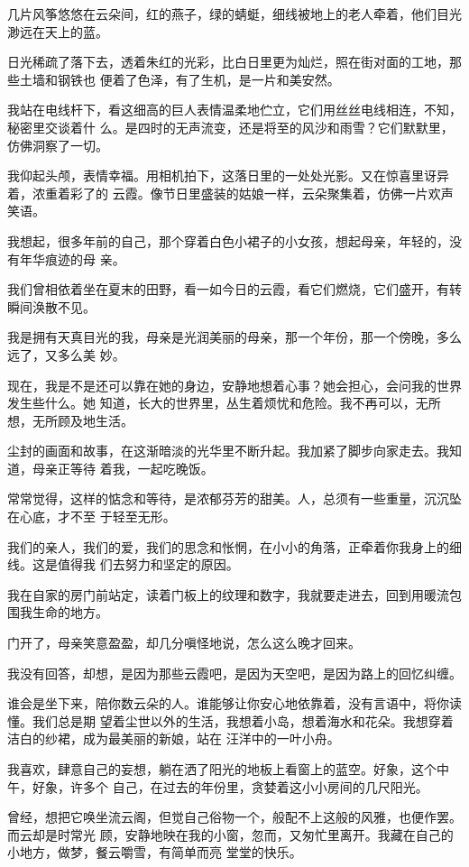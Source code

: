 		几片风筝悠悠在云朵间，红的燕子，绿的蜻蜓，细线被地上的老人牵着，他们目光渺远在天上的蓝。

		日光稀疏了落下去，透着朱红的光彩，比白日里更为灿烂，照在街对面的工地，那些土墙和钢铁也
	便着了色泽，有了生机，是一片和美安然。

		我站在电线杆下，看这细高的巨人表情温柔地伫立，它们用丝丝电线相连，不知，秘密里交谈着什
	么。是四时的无声流变，还是将至的风沙和雨雪？它们默默里，仿佛洞察了一切。


		我仰起头颅，表情幸福。用相机拍下，这落日里的一处处光影。又在惊喜里讶异着，浓重着彩了的
	云霞。像节日里盛装的姑娘一样，云朵聚集着，仿佛一片欢声笑语。

		我想起，很多年前的自己，那个穿着白色小裙子的小女孩，想起母亲，年轻的，没有年华痕迹的母
	亲。

		我们曾相依着坐在夏末的田野，看一如今日的云霞，看它们燃烧，它们盛开，有转瞬间涣散不见。

		我是拥有天真目光的我，母亲是光润美丽的母亲，那一个年份，那一个傍晚，多么远了，又多么美
	妙。

		现在，我是不是还可以靠在她的身边，安静地想着心事？她会担心，会问我的世界发生些什么。她
	知道，长大的世界里，丛生着烦忧和危险。我不再可以，无所想，无所顾及地生活。


		尘封的画面和故事，在这渐暗淡的光华里不断升起。我加紧了脚步向家走去。我知道，母亲正等待
	着我，一起吃晚饭。

		常常觉得，这样的惦念和等待，是浓郁芬芳的甜美。人，总须有一些重量，沉沉坠在心底，才不至
	于轻至无形。

		我们的亲人，我们的爱，我们的思念和怅惘，在小小的角落，正牵着你我身上的细线。这是值得我
	们去努力和坚定的原因。

		我在自家的房门前站定，读着门板上的纹理和数字，我就要走进去，回到用暖流包围我生命的地方。

		门开了，母亲笑意盈盈，却几分嗔怪地说，怎么这么晚才回来。

		我没有回答，却想，是因为那些云霞吧，是因为天空吧，是因为路上的回忆纠缠。


		谁会是坐下来，陪你数云朵的人。谁能够让你安心地依靠着，没有言语中，将你读懂。我们总是期
	望着尘世以外的生活，我想着小岛，想着海水和花朵。我想穿着洁白的纱裙，成为最美丽的新娘，站在
	汪洋中的一叶小舟。


		我喜欢，肆意自己的妄想，躺在洒了阳光的地板上看窗上的蓝空。好象，这个中午，好象，许多个
	自己，在过去的年份里，贪婪着这小小房间的几尺阳光。

		曾经，想把它唤坐流云阁，但觉自己俗物一个，般配不上这般的风雅，也便作罢。而云却是时常光
	顾，安静地映在我的小窗，忽而，又匆忙里离开。我藏在自己的小地方，做梦，餐云嚼雪，有简单而亮
	堂堂的快乐。


